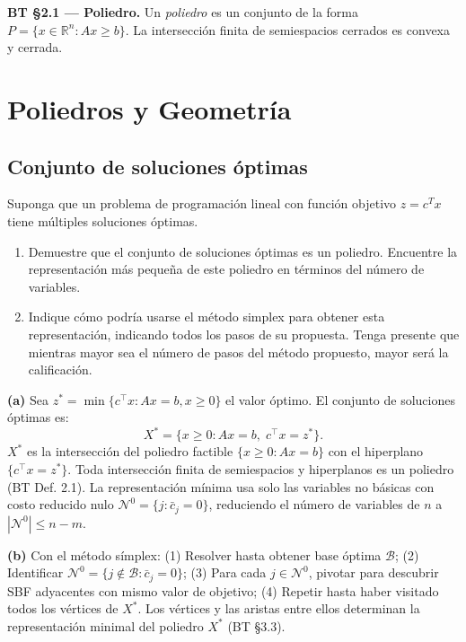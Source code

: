 \documentclass[12pt]{article}
\theoremstyle{plain}
\begin{document}
\begin{teofund}\textbf{BT §2.1 — Poliedro.} Un \emph{poliedro} es un conjunto de la forma $P=\{x\in\mathbb{R}^n:Ax\geq b\}$. La intersección finita de semiespacios cerrados es convexa y cerrada.\end{teofund}

\bigskip

\section{Poliedros y Geometría}

\subsection{Conjunto de soluciones óptimas}

Suponga que un problema de programación lineal con función objetivo $z = c^{T}x$ tiene
múltiples soluciones óptimas.

\begin{enumerate}[label=\alph*)]
      \item Demuestre que el conjunto de soluciones óptimas es un poliedro. Encuentre la
            representación más pequeña de este poliedro en términos del número de variables.

      \item Indique cómo podría usarse el método simplex para obtener esta representación,
            indicando todos los pasos de su propuesta. Tenga presente que mientras mayor sea
            el número de pasos del método propuesto, mayor será la calificación.
\end{enumerate}

\begin{solucion}

\noindent\textbf{(a)} Sea $z^* = \min\{c^\top x : Ax = b, x \geq 0\}$ el valor óptimo. El conjunto de soluciones óptimas es:
\[
X^* = \{x \geq 0 : Ax = b,\; c^\top x = z^*\}.
\]
$X^*$ es la intersección del poliedro factible $\{x \geq 0 : Ax = b\}$ con el hiperplano $\{c^\top x = z^*\}$. Toda intersección finita de semiespacios y hiperplanos es un poliedro (BT Def. 2.1). La representación mínima usa solo las variables no básicas con costo reducido nulo $\mathcal{N}^0 = \{j : \bar{c}_j = 0\}$, reduciendo el número de variables de $n$ a $|\mathcal{N}^0| \leq n - m$.

\noindent\textbf{(b)} Con el método símplex: (1) Resolver hasta obtener base óptima $\mathcal{B}$; (2) Identificar $\mathcal{N}^0 = \{j \notin \mathcal{B} : \bar{c}_j = 0\}$; (3) Para cada $j \in \mathcal{N}^0$, pivotar para descubrir SBF adyacentes con mismo valor de objetivo; (4) Repetir hasta haber visitado todos los vértices de $X^*$. Los vértices y las aristas entre ellos determinan la representación minimal del poliedro $X^*$ (BT §3.3).

\end{solucion}
\end{document}
